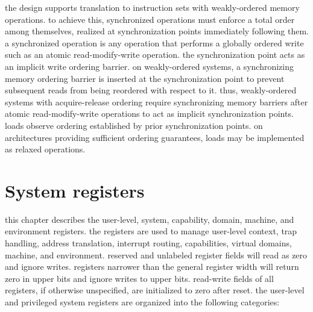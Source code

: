 \par\noindent
the design supports translation to instruction sets with
weakly-ordered memory operations.
to achieve this, synchronized operations must enforce a total order among
themselves, realized at synchronization points immediately following them.
a synchronized operation is any operation that performs a globally
ordered write such as an atomic read-modify-write operation.
the synchronization point acts as an implicit write ordering barrier.
on weakly-ordered systems, a synchronizing memory ordering barrier is
inserted at the synchronization point to prevent subsequent reads from
being reordered with respect to it.
\para
thus, weakly-ordered systems with acquire-release ordering require
synchronizing memory barriers after atomic read-modify-write
operations to act as implicit synchronization points.
loads observe ordering established by prior synchronization points.
on architectures providing sufficient ordering guarantees, loads may be
implemented as relaxed operations.

\chapter{System registers}

this chapter describes the user-level, system, capability, domain,
machine, and environment registers. the registers are used to manage
user-level context, trap handling, address translation, interrupt
routing, capabilities, virtual domains, machine, and environment.
\para
reserved and unlabeled register fields will read as zero and ignore writes.
registers narrower than the general register width will return zero in upper
bits and ignore writes to upper bits. read-write fields of all registers,
if otherwise unspecified, are initialized to zero after reset.
\para
the user-level and privileged system registers are organized into the following categories:


